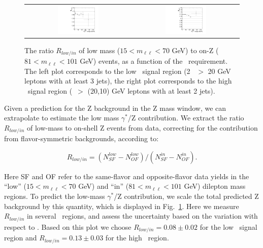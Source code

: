 \begin{figure}[t]
\begin{center}
\begin{tabular}{cc}
\includegraphics[width=0.4\textwidth]{plots/Routin_lowmet.pdf} &
\includegraphics[width=0.4\textwidth]{plots/Routin_highMET.pdf} \\
\end{tabular}
\caption{\label{fig:Routin}
The ratio $R_{low/in}$ of low mass ($15<m_{\ell\ell}<70$ GeV) to on-Z ($81<m_{\ell\ell}<101$ GeV) events, as a function of
the \MET\ requirement. The left plot corresponds to the low \MET\ signal region (2 \pt\ $>$ 20 GeV leptons with at least 3 jets),
the right plot corresponds to the high \MET\ signal region (\pt\ $>$ (20,10) GeV leptons with at least 2 jets). 
}
\end{center}
\end{figure}

Given a prediction for the Z background in the Z mass window, we can extrapolate to estimate the low mass $\gamma^*$/Z contribution.
We extract the ratio $R_{low/in}$ of low-mass  to on-shell Z events from data,
correcting for the contribution from flavor-symmetric backgrounds, according to:

\begin{equation}
R_{low/in} = (N_{SF}^{low}-N_{OF}^{low})/(N_{SF}^{in}-N_{OF}^{in}).
\end{equation}

Here SF and OF refer to the same-flavor and opposite-flavor data yields in the ``low'' ($15<m_{\ell\ell}<70$ GeV) and ``in'' 
($81<m_{\ell\ell}<101$ GeV) dilepton mass regions. To predict the low-mass $\gamma^*$/Z contribution, we scale the total predicted
Z background by this quantity, which is displayed in Fig.~\ref{fig:Routin}. Here we measure $R_{low/in}$ in several \MET\ regions,
and assess the uncertainty based on the variation with respect to \MET. 
Based on this plot we choose $R_{low/in}=0.08\pm0.02$ for the low \MET\ signal region and $R_{low/in}=0.13\pm0.03$ for the high \MET\ region.

